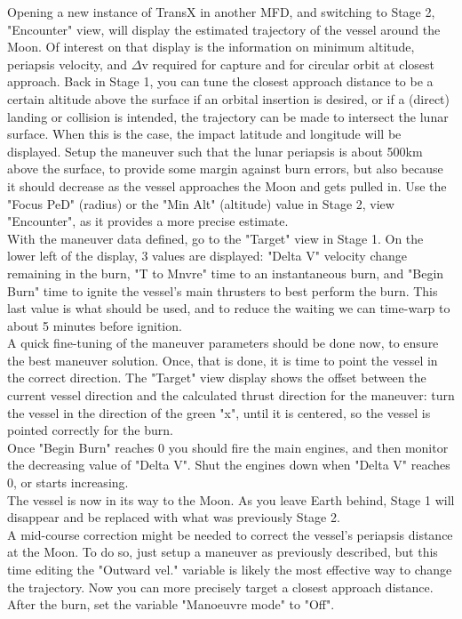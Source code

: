 \documentclass[Orbiter User Manual.tex]{subfiles}
\begin{document}
Opening a new instance of TransX in another MFD, and switching to Stage 2, "Encounter" view, will display the estimated trajectory of the vessel around the Moon. Of interest on that display is the information on minimum altitude, periapsis velocity, and $\Delta$v required for capture and for circular orbit at closest approach. Back in Stage 1, you can tune the closest approach distance to be a certain altitude above the surface if an orbital insertion is desired, or if a (direct) landing or collision is intended, the trajectory can be made to intersect the lunar surface. When this is the case, the impact latitude and longitude will be displayed. Setup the maneuver such that the lunar periapsis is about 500km above the surface, to provide some margin against burn errors, but also because it should decrease as the vessel approaches the Moon and gets pulled in. Use the "Focus PeD" (radius) or the "Min Alt" (altitude) value in Stage 2, view "Encounter", as it provides a more precise estimate.\\
With the maneuver data defined, go to the "Target" view in Stage 1. On the lower left of the display, 3 values are displayed: "Delta V" velocity change remaining in the burn, "T to Mnvre" time to an instantaneous burn, and "Begin Burn" time to ignite the vessel's main thrusters to best perform the burn. This last value is what should be used, and to reduce the waiting we can time-warp to about 5 minutes before ignition.\\
A quick fine-tuning of the maneuver parameters should be done now, to ensure the best maneuver solution. Once, that is done, it is time to point the vessel in the correct direction. The "Target" view display shows the offset between the current vessel direction and the calculated thrust direction for the maneuver: turn the vessel in the direction of the green "x", until it is centered, so the vessel is pointed correctly for the burn.\\
Once "Begin Burn" reaches 0 you should fire the main engines, and then monitor the decreasing value of "Delta V". Shut the engines down when "Delta V" reaches 0, or starts increasing.\\
The vessel is now in its way to the Moon. As you leave Earth behind, Stage 1 will disappear and be replaced with what was previously Stage 2.\\
A mid-course correction might be needed to correct the vessel's periapsis distance at the Moon. To do so, just setup a maneuver as previously described, but this time editing the "Outward vel." variable is likely the most effective way to change the trajectory. Now you can more precisely target a closest approach distance. After the burn, set the variable "Manoeuvre mode" to "Off".\\
\end{document}
